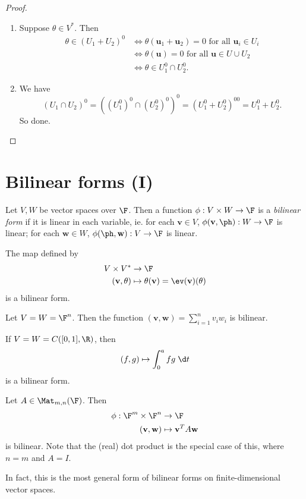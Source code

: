 \documentclass[a4paper]{article}
\begin{document}
\begin{proof}\leavevmode
  \begin{enumerate}
    \item Suppose $\theta \in V^*$. Then
      \begin{align*}
        \theta \in (U_1 + U_2)^0 &\Leftrightarrow \theta (\mathbf{u}_1 + \mathbf{u}_2) = 0\text{ for all }\mathbf{u}_i \in U_i\\
        &\Leftrightarrow \theta (\mathbf{u}) = 0\text{ for all }\mathbf{u} \in U\cup U_2\\
        &\Leftrightarrow \theta \in U_1^0 \cap U_2^0.
      \end{align*}
    \item We have
      \[
        (U_1 \cap U_2)^0 = ((U_1^0)^0 \cap (U_2^0)^0)^0 = (U_1^0 + U_2^0)^{00} = U_1^0 + U_2^0.
      \]
      So done.
  \end{enumerate}
\end{proof}

\section{Bilinear forms (I)}
\begin{defi}
  Let $V, W$ be vector spaces over $\F$. Then a function $\phi: V\times W \to \F$ is a \emph{bilinear form} if it is linear in each variable, ie. for each $\mathbf{v} \in V$, $\phi(\mathbf{v}, \ph): W \to \F$ is linear; for each $\mathbf{w} \in W$, $\phi(\ph, \mathbf{w}): V\to \F$ is linear.
\end{defi}

\begin{eg}
  The map defined by
  \begin{align*}
    V\times V^* &\to \F\\
    (\mathbf{v}, \theta) &\mapsto  \theta(\mathbf{v}) = \ev(\mathbf{v})(\theta)
  \end{align*}
  is a bilinear form.
\end{eg}

\begin{eg}
  Let $V = W = \F^n$. Then the function $(\mathbf{v}, \mathbf{w}) = \sum_{i = 1}^n v_i w_i$ is bilinear.
\end{eg}

\begin{eg}
  If $V = W = C([0, 1], \R)$, then
  \[
    (f, g) \mapsto \int_0^a fg \;\d t
  \]
  is a bilinear form.
\end{eg}

\begin{eg}
  Let $A \in \Mat_{m, n}(\F)$. Then
  \begin{align*}
    \phi: \F^m \times \F^n &\to \F\\
       (\mathbf{v}, \mathbf{w}) &\mapsto \mathbf{v}^T A\mathbf{w}
  \end{align*}
  is bilinear. Note that the (real) dot product is the special case of this, where $n = m$ and $A = I$.
\end{eg}
In fact, this is the most general form of bilinear forms on finite-dimensional vector spaces.
\end{document}

